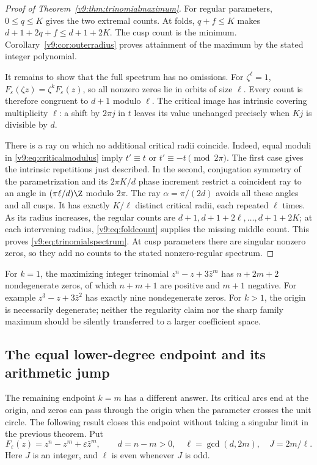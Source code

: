 \documentclass[UTF8,11pt]{ctexart}
\theoremstyle{definition}
\numberwithin{equation}{section}
\begin{document}
\begin{proof}[Proof of Theorem~\ref{v9:thm:trinomialmaximum}]
For regular parameters, $0\le q\le K$ gives the two extremal
counts. At folds, $q+f\le K$ makes
$d+1+2q+f\le d+1+2K$. The cusp count is the minimum.
Corollary~\ref{v9:cor:outerradius} proves attainment of the maximum
by the stated integer polynomial.

It remains to show that the full spectrum has no omissions.
For $\zeta^\ell=1$, $F_\varepsilon(\zeta z)=\zeta^kF_\varepsilon(z)$,
so all nonzero zeros lie in orbits of size $\ell$. Every count
is therefore congruent to $d+1$ modulo $\ell$.
The critical image has intrinsic covering multiplicity $\ell$:
a shift by $2\pi j$ in $t$ leaves its value unchanged precisely
when $Kj$ is divisible by $d$.

There is a ray on which no additional critical radii coincide.
Indeed, equal moduli in \eqref{v9:eq:criticalmodulus} imply
$t'\equiv t$ or $t'\equiv-t\pmod{2\pi}$.
The first case gives the intrinsic repetitions just described.
In the second, conjugation symmetry of the parametrization and
its $2\pi K/d$ phase increment restrict a coincident ray to
an angle in $(\pi\ell/d)\Z$ modulo $2\pi$.
The ray $\alpha=\pi/(2d)$ avoids all these angles and all cusps.
It has exactly $K/\ell$ distinct critical radii, each repeated
$\ell$ times. As its radius increases, the regular counts are
$d+1,d+1+2\ell,\ldots,d+1+2K$; at each intervening radius,
\eqref{v9:eq:foldcount} supplies the missing middle count.
This proves \eqref{v9:eq:trinomialspectrum}.
At cusp parameters there are singular nonzero zeros, so they add
no counts to the stated nonzero-regular spectrum.
\end{proof}

For $k=1$, the maximizing integer trinomial
$z^n-z+3\bar z^m$ has $n+2m+2$ nondegenerate zeros, of which
$n+m+1$ are positive and $m+1$ negative. For example
$z^3-z+3\bar z^2$ has exactly nine nondegenerate zeros.
For $k>1$, the origin is necessarily degenerate; neither the
regularity claim nor the sharp family maximum should be silently
transferred to a larger coefficient space.


\subsection{The equal lower-degree endpoint and its arithmetic jump}
\label{v10:sec:endpoint}

The remaining endpoint $k=m$ has a different answer. Its critical
arcs end at the origin, and zeros can pass through the origin when
the parameter crosses the unit circle. The following result closes
this endpoint without taking a singular limit in the previous theorem.
Put
\[
 F_\varepsilon(z)=z^n-z^m+\varepsilon\bar z^m,
 \qquad d=n-m>0,\quad \ell=\gcd(d,2m),\quad J=2m/\ell.
\]
Here $J$ is an integer, and $\ell$ is even whenever $J$ is odd.
\end{document}
